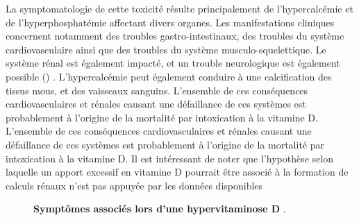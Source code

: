 \documentclass[
  a4paper,
  DIV=11,
  numbers=noendperiod,
  listof=totoc]{scrreprt}
\begin{document}
La symptomatologie de cette toxicité résulte principalement de
l'hypercalcémie et de l'hyperphosphatémie
\autocite{DeLuca.2011,Janoušek.2022,Jones.2008,IOM.2011} affectant
divers organes. Les manifestations cliniques concernent notamment des
troubles gastro-intestinaux, des troubles du système cardiovasculaire
ainsi que des troubles du système musculo-squelettique. Le système rénal
est également impacté, et un trouble neurologique est également possible
() \autocite{Alshahrani.2013,Janoušek.2022}.
L'hypercalcémie peut également conduire à une calcification des tissus
mous, et des vaisseaux sanguins. L'ensemble de ces conséquences
cardiovasculaires et rénales causant une défaillance de ces systèmes est
probablement à l'origine de la mortalité par intoxication à la vitamine
D. L'ensemble de ces conséquences cardiovasculaires et rénales causant
une défaillance de ces systèmes est probablement à l'origine de la
mortalité par intoxication à la vitamine D. Il est intéressant de noter
que l'hypothèse selon laquelle un apport excessif en vitamine D pourrait
être associé à la formation de calculs rénaux n'est pas appuyée par les
données disponibles \autocite{IOM.2011}

\begin{figure}


\caption[Symptômes associés lors d'une hypervitaminose
D.]{\label{fig-hypervitaminose-d}\textbf{Symptômes associés lors d'une
hypervitaminose D} \autocite{Janoušek.2022}.}

\end{figure}%
\end{document}
